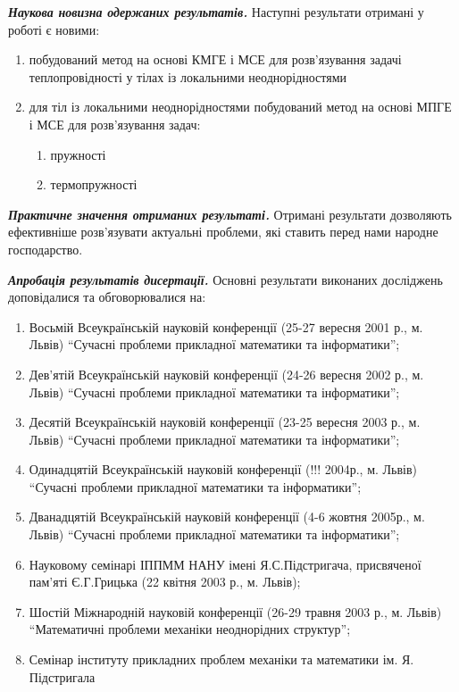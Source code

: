 \emph{\textbf{Наукова новизна одержаних результатів.}} Наступні
результати отримані у роботі є новими:

\begin{enumerate}
\def\labelenumi{\arabic{enumi}.}
\item
  побудований метод на основі КМГЕ і МСЕ для розв'язування задачі
  теплопровідності у тілах із локальними неоднорідностями
\item
  для тіл із локальними неоднорідностями побудований метод на основі
  МПГЕ і МСЕ для розв'язування задач:

  \begin{enumerate}
  \def\labelenumii{\alph{enumii}.}
  \item
    пружності
  \item
    термопружності
  \end{enumerate}
\end{enumerate}

\textbf{\emph{Практичне значення отриманих результаті.}} Отримані
результати дозволяють ефективніше розв'язувати актуальні проблеми, які
ставить перед нами народне господарство.

\emph{\textbf{Апробація результатів дисертації.}} Основні результати
виконаних досліджень доповідалися та обговорювалися на:

\begin{enumerate}
\def\labelenumi{\arabic{enumi}.}
\item
  Восьмій Всеукраїнській науковій конференції (25-27 вересня 2001 р., м.
  Львів) ``Сучасні проблеми прикладної математики та інформатики'';
\item
  Дев'ятій Всеукраїнській науковій конференції (24-26 вересня 2002 р.,
  м. Львів) ``Сучасні проблеми прикладної математики та інформатики'';
\item
  Десятій Всеукраїнській науковій конференції (23-25 вересня 2003 р., м.
  Львів) ``Сучасні проблеми прикладної математики та інформатики'';
\item
  Одинадцятій Всеукраїнській науковій конференції (!!! 2004р., м. Львів)
  ``Сучасні проблеми прикладної математики та інформатики'';
\item
  Дванадцятій Всеукраїнській науковій конференції (4-6 жовтня 2005р., м.
  Львів) ``Сучасні проблеми прикладної математики та інформатики'';
\item
  Науковому семінарі ІППММ НАНУ імені Я.С.Підстригача, присвяченої
  пам'яті Є.Г.Грицька (22 квітня 2003 р., м. Львів);
\item
  Шостій Міжнародній науковій конференції (26-29 травня 2003 р., м.
  Львів) ``Математичні проблеми механіки неоднорідних структур'';
\item
  Семінар інституту прикладних проблем механіки та математики ім. Я.
  Підстригала
\end{enumerate}

